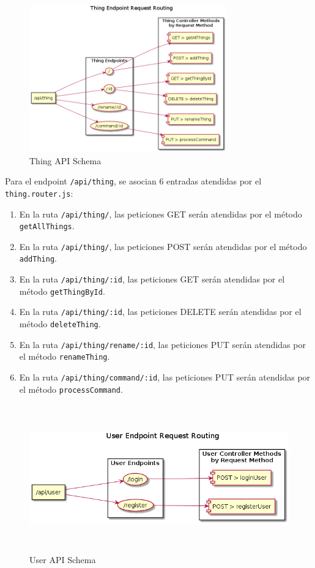 \begin{figure}[hbt!]
\centering
\includegraphics[height=2.5in]{figures/diagrams/back/router-flow/thing-endpoints.png}
\caption[thing-endpoints]{Thing API Schema\footnotemark}
\end{figure}

\vspace{0.5cm}

Para el endpoint \verb|/api/thing|, se asocian 6 entradas atendidas por el \verb|thing.router.js|:
\begin{enumerate}
\item En la ruta \verb|/api/thing/|, las peticiones GET serán atendidas por el método \verb|getAllThings|.
\item En la ruta \verb|/api/thing/|, las peticiones POST serán atendidas por el método \verb|addThing|.
\item En la ruta \verb|/api/thing/:id|, las peticiones GET serán atendidas por el método \verb|getThingById|.
\item En la ruta \verb|/api/thing/:id|, las peticiones DELETE serán atendidas por el método \verb|deleteThing|.
\item En la ruta \verb|/api/thing/rename/:id|, las peticiones PUT serán atendidas por el método \verb|renameThing|.
\item En la ruta \verb|/api/thing/command/:id|, las peticiones PUT serán atendidas por el método \verb|processCommand|.
\end{enumerate}

\begin{figure}[hbt!]
\centering
\includegraphics[height=2.5in]{figures/diagrams/back/router-flow/user-endpoints.png}
\caption[user-endpoints]{User API Schema\footnotemark}
\end{figure}

